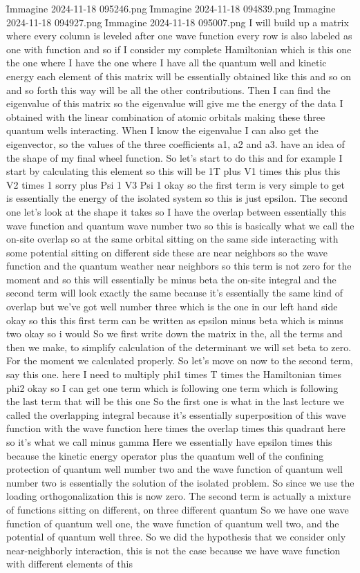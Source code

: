 \f{Immagine 2024-11-18 095246.png}
\f{Immagine 2024-11-18 094839.png}
\f{Immagine 2024-11-18 094927.png}
\f{Immagine 2024-11-18 095007.png}
I will build up a matrix where every column is leveled after one wave function every row is also labeled as one with function and so if I consider my complete Hamiltonian which is this one the one where I have the one where I have all the quantum well and kinetic energy each element of this matrix will be essentially obtained like this and so on and so forth this way will be all the other contributions. Then I can find the eigenvalue of this matrix so the eigenvalue will give me the energy of the data I obtained with the linear combination of atomic orbitals making these three quantum wells interacting. When I know the eigenvalue I can also get the eigenvector, so the values of the three coefficients a1, a2 and a3. have an idea of the shape of my final wheel function. So let's start to do this and for example I start by calculating this element so this will be 1T plus V1 times this plus this V2 times 1 sorry plus Psi 1 V3 Psi 1 okay so the first term is very simple to get is essentially the energy of the isolated system so this is just epsilon. The second one let's look at the shape it takes so I have the overlap between essentially this wave function and quantum wave number two so this is basically what we call the on-site overlap so at the same orbital sitting on the same side interacting with some potential sitting on different side these are near neighbors so the wave function and the quantum weather near neighbors so this term is not zero for the moment and so this will essentially be minus beta the on-site integral and the second term will look exactly the same because it's essentially the same kind of overlap but we've got well number three which is the one in our left hand side okay so this this first term can be written as epsilon minus beta which is minus two okay so i would So we first write down the matrix in the, all the terms and then we make, to simplify calculation of the determinant we will set beta to zero. For the moment we calculated properly. So let's move on now to the second term, say this one. here I need to multiply phi1 times T times the Hamiltonian times phi2 okay so I can get one term which is following one term which is following the last term that will be this one So the first one is what in the last lecture we called the overlapping integral because it's essentially superposition of this wave function with the wave function here times the overlap times this quadrant here so it's what we call minus gamma Here we essentially have epsilon times this because the kinetic energy operator plus the quantum well of the confining protection of quantum well number two and the wave function of quantum well number two is essentially the solution of the isolated problem. So since we use the loading orthogonalization this is now zero. The second term is actually a mixture of functions sitting on different, on three different quantum So we have one wave function of quantum well one, the wave function of quantum well two, and the potential of quantum well three. So we did the hypothesis that we consider only near-neighborly interaction, this is not the case because we have wave function with different elements of this 